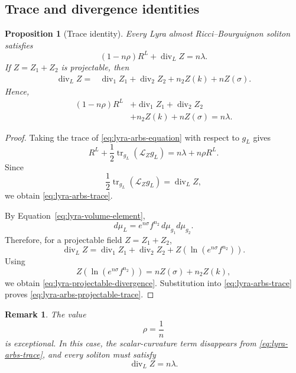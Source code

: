 \documentclass[a4paper,11pt]{article}
\theoremstyle{plain}
\newtheorem{proposition}{Proposition}[section]
\newtheorem{remark}{Remark}[section]
\numberwithin{equation}{section}
\begin{document}
\subsection{Trace and divergence identities}
\label{subsec:lyra-arbs-trace}

\begin{proposition}[Trace identity]
	\label{prop:lyra-arbs-trace}
	Every Lyra almost Ricci--Bourguignon soliton satisfies
	\begin{equation}
		(1-n\rho)R^{L}
		+
		\operatorname{div}_{L}Z
		=
		n\lambda.
		\label{eq:lyra-arbs-trace}
	\end{equation}
	If \(Z=Z_{1}+Z_{2}\) is projectable, then
	\begin{align}
		\operatorname{div}_{L}Z
		={}&
		\operatorname{div}_{1}Z_{1}
		+
		\operatorname{div}_{2}Z_{2}
		+
		n_{2}Z(k)
		+
		nZ(\sigma).
		\label{eq:lyra-projectable-divergence}
	\end{align}
	Hence,
	\begin{align}
		(1-n\rho)R^{L}
		&+
		\operatorname{div}_{1}Z_{1}
		+
		\operatorname{div}_{2}Z_{2}
		\nonumber\\
		&+
		n_{2}Z(k)
		+
		nZ(\sigma)
		=
		n\lambda.
		\label{eq:lyra-arbs-projectable-trace}
	\end{align}
\end{proposition}

\begin{proof}
	Taking the trace of
	\eqref{eq:lyra-arbs-equation} with respect to \(g_{L}\) gives
	\[
	R^{L}
	+
	\frac{1}{2}
	\operatorname{tr}_{g_{L}}
	(\mathcal L_{Z}g_{L})
	=
	n\lambda+n\rho R^{L}.
	\]
	Since
	\[
	\frac{1}{2}
	\operatorname{tr}_{g_{L}}
	(\mathcal L_{Z}g_{L})
	=
	\operatorname{div}_{L}Z,
	\]
	we obtain \eqref{eq:lyra-arbs-trace}.
	
	By Equation~\eqref{eq:lyra-volume-element},
	\[
	d\mu_{L}
	=
	e^{n\sigma}f^{n_{2}}\,
	d\mu_{g_{1}}d\mu_{g_{2}}.
	\]
	Therefore, for a projectable field \(Z=Z_{1}+Z_{2}\),
	\[
	\operatorname{div}_{L}Z
	=
	\operatorname{div}_{1}Z_{1}
	+
	\operatorname{div}_{2}Z_{2}
	+
	Z\!\left(
	\ln(e^{n\sigma}f^{n_{2}})
	\right).
	\]
	Using
	\[
	Z\!\left(
	\ln(e^{n\sigma}f^{n_{2}})
	\right)
	=
	nZ(\sigma)+n_{2}Z(k),
	\]
	we obtain \eqref{eq:lyra-projectable-divergence}. Substitution
	into \eqref{eq:lyra-arbs-trace} proves
	\eqref{eq:lyra-arbs-projectable-trace}.
\end{proof}

\begin{remark}
	\label{rem:critical-bourguignon-parameter}
	The value
	\[
	\rho=\frac{1}{n}
	\]
	is exceptional. In this case, the scalar-curvature term
	disappears from \eqref{eq:lyra-arbs-trace}, and every soliton must
	satisfy
	\[
	\operatorname{div}_{L}Z=n\lambda.
	\]
\end{remark}
\end{document}
